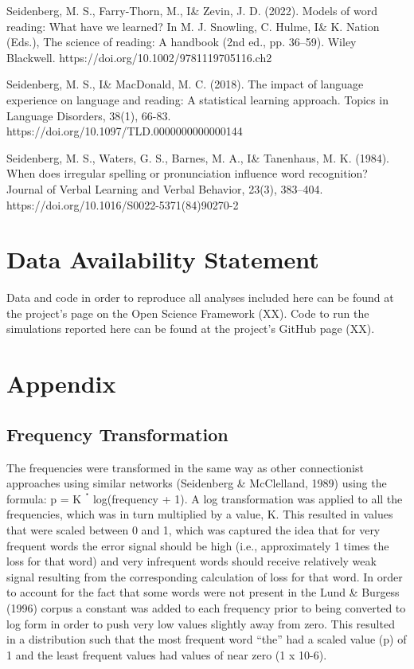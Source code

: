 \documentclass[
  ,man,floatsintext]{apa6}
\begin{document}
\begin{hangparas}{1.5em}{1}
Seidenberg, M. S., Farry-Thorn, M., I\& Zevin, J. D. (2022). Models of word reading: What have we learned? In M. J. Snowling, C. Hulme, I\& K. Nation (Eds.), The science of reading: A handbook (2nd ed., pp. 36–59). Wiley Blackwell. https://doi.org/10.1002/9781119705116.ch2

Seidenberg, M. S., I\& MacDonald, M. C. (2018). The impact of language experience on language and reading: A statistical learning approach. Topics in Language Disorders, 38(1), 66-83. https://doi.org/10.1097/TLD.0000000000000144

Seidenberg, M. S., Waters, G. S., Barnes, M. A., I\& Tanenhaus, M. K. (1984). When does irregular spelling or pronunciation influence word recognition? Journal of Verbal Learning and Verbal Behavior, 23(3), 383–404. https://doi.org/10.1016/S0022-5371(84)90270-2

\end{hangparas}

\section{Data Availability Statement}\label{data-availability-statement}

Data and code in order to reproduce all analyses included here can be found at the project's page on the Open Science Framework (XX). Code to run the simulations reported here can be found at the project's GitHub page (XX).

\section{Appendix}\label{appendix}

\subsection{Frequency Transformation}\label{frequency-transformation}

The frequencies were transformed in the same way as other connectionist approaches using similar networks (Seidenberg \& McClelland, 1989) using the formula: p = K ॱ log(frequency + 1). A log transformation was applied to all the frequencies, which was in turn multiplied by a value, K. This resulted in values that were scaled between 0 and 1, which was captured the idea that for very frequent words the error signal should be high (i.e., approximately 1 times the loss for that word) and very infrequent words should receive relatively weak signal resulting from the corresponding calculation of loss for that word. In order to account for the fact that some words were not present in the Lund \& Burgess (1996) corpus a constant was added to each frequency prior to being converted to log form in order to push very low values slightly away from zero. This resulted in a distribution such that the most frequent word ``the'' had a scaled value (p) of 1 and the least frequent values had values of near zero (1 x 10-6).
\end{document}
